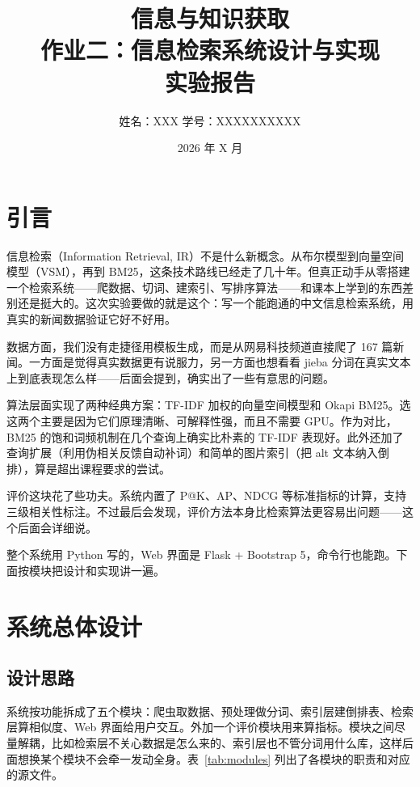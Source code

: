 \documentclass[12pt, a4paper]{ctexart}
\title{
    \vspace{1cm}
    {\LARGE \textbf{信息与知识获取}} \\[0.6cm]
    {\Large 作业二：信息检索系统设计与实现} \\[0.4cm]
    {\large 实验报告}
    \vspace{0.5cm}
}
\author{
    姓名：XXX \quad 学号：XXXXXXXXXX \\[0.2cm]
}
\date{2026 年 X 月}
\begin{document}
\maketitle
\thispagestyle{empty}
\newpage
\setcounter{page}{1}
\tableofcontents
\newpage


\section{引言}

信息检索（Information Retrieval, IR）不是什么新概念。从布尔模型到向量空间模型（VSM），再到 BM25，这条技术路线已经走了几十年。但真正动手从零搭建一个检索系统——爬数据、切词、建索引、写排序算法——和课本上学到的东西差别还是挺大的。这次实验要做的就是这个：写一个能跑通的中文信息检索系统，用真实的新闻数据验证它好不好用。

数据方面，我们没有走捷径用模板生成，而是从网易科技频道直接爬了 167 篇新闻。一方面是觉得真实数据更有说服力，另一方面也想看看 jieba 分词在真实文本上到底表现怎么样——后面会提到，确实出了一些有意思的问题。

算法层面实现了两种经典方案：TF-IDF 加权的向量空间模型和 Okapi BM25。选这两个主要是因为它们原理清晰、可解释性强，而且不需要 GPU。作为对比，BM25 的饱和词频机制在几个查询上确实比朴素的 TF-IDF 表现好。此外还加了查询扩展（利用伪相关反馈自动补词）和简单的图片索引（把 alt 文本纳入倒排），算是超出课程要求的尝试。

评价这块花了些功夫。系统内置了 P@K、AP、NDCG 等标准指标的计算，支持三级相关性标注。不过最后会发现，评价方法本身比检索算法更容易出问题——这个后面会详细说。

整个系统用 Python 写的，Web 界面是 Flask + Bootstrap 5，命令行也能跑。下面按模块把设计和实现讲一遍。


\section{系统总体设计}

\subsection{设计思路}

系统按功能拆成了五个模块：爬虫取数据、预处理做分词、索引层建倒排表、检索层算相似度、Web 界面给用户交互。外加一个评价模块用来算指标。模块之间尽量解耦，比如检索层不关心数据是怎么来的、索引层也不管分词用什么库，这样后面想换某个模块不会牵一发动全身。表~\ref{tab:modules} 列出了各模块的职责和对应的源文件。
\end{document}
